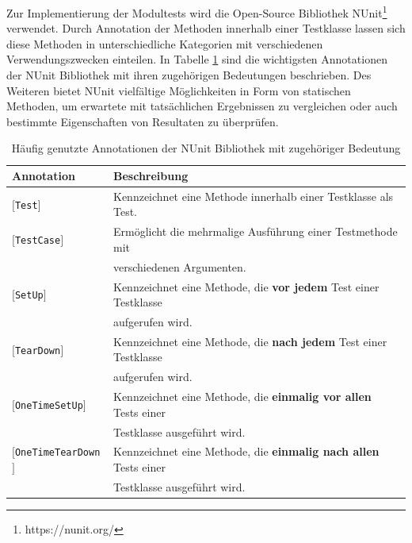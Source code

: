 Zur Implementierung der Modultests wird die Open-Source Bibliothek NUnit\footnote{https://nunit.org/} verwendet. Durch Annotation der Methoden innerhalb einer Testklasse lassen sich diese Methoden in unterschiedliche Kategorien mit verschiedenen Verwendungszwecken einteilen. In Tabelle \ref{tab:nunit_annotations} sind die wichtigsten Annotationen der NUnit Bibliothek mit ihren zugehörigen Bedeutungen beschrieben. Des Weiteren bietet NUnit vielfältige Möglichkeiten in Form von statischen Methoden, um erwartete mit tatsächlichen Ergebnissen zu vergleichen oder auch bestimmte Eigenschaften von Resultaten zu überprüfen. 



\begin{table}[t!]
\caption[Häufig genutzte Annotationen der NUnit Bibliothek mit zugehöriger Bedeutung]{Häufig genutzte Annotationen der NUnit Bibliothek mit zugehöriger Bedeutung}
\begin{center}
\begin{tabular}{|l|l|}
\hline
  Annotation & Beschreibung \\
  \hline
  \texttt{$[$Test$]$} & Kennzeichnet eine Methode innerhalb einer Testklasse als Test. \\
  \texttt{$[$TestCase$]$} & Ermöglicht die mehrmalige Ausführung einer Testmethode mit \\ 
  &	verschiedenen Argumenten. \\
  \texttt{$[$SetUp$]$} & Kennzeichnet eine Methode, die \textbf{vor jedem} Test einer Testklasse \\
  & aufgerufen wird. \\
  \texttt{$[$TearDown$]$} & Kennzeichnet eine Methode, die \textbf{nach jedem} Test einer Testklasse \\
  & aufgerufen wird.  \\
  \texttt{$[$OneTimeSetUp$]$} & Kennzeichnet eine Methode, die \textbf{einmalig vor allen} Tests einer \\
  & Testklasse ausgeführt wird. \\ 
  \texttt{$[$OneTimeTearDown$]$} & Kennzeichnet eine Methode, die \textbf{einmalig nach allen} Tests einer \\
  & Testklasse ausgeführt wird.  \\
  \hline
\end{tabular}
\label{tab:nunit_annotations}
\end{center}
\end{table}


